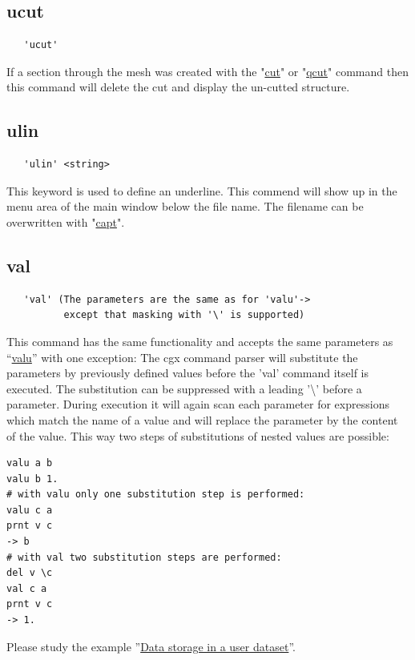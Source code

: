 \documentclass{article}
\providecommand{\htmlref}[2]{\hyperref[#2]{#1}}
\begin{document}
\subsection{\label{ucut}ucut}
\begin{verbatim}
   'ucut'
\end{verbatim}
If a section through the mesh was created with the "\htmlref{cut}{cut}" or "\htmlref{qcut}{qcut}" command then this command will delete the cut and display the un-cutted structure.

\subsection{\label{ulin}ulin}
\begin{verbatim}
   'ulin' <string> 
\end{verbatim}
This keyword is used to define an underline. This commend will show up in the
menu area of the main window below the file name. The filename can be overwritten with "\htmlref{capt}{capt}".

\subsection{\label{val}val}
\begin{verbatim}
   'val' (The parameters are the same as for 'valu'->
          except that masking with '\' is supported)
\end{verbatim}
This command has the same functionality and accepts the same parameters as ``\htmlref{valu}{valu}'' with one exception: The cgx command parser will substitute the parameters by previously defined values before the 'val' command itself is executed. The substitution can be suppressed with a leading '\textbackslash{}' before a parameter. During execution it will again scan each parameter for expressions which match the name of a value and will replace the parameter by the content of the value. This way two steps of substitutions of nested values are possible:
\begin{verbatim}
valu a b
valu b 1.
# with valu only one substitution step is performed:
valu c a
prnt v c
-> b
# with val two substitution steps are performed:
del v \c
val c a
prnt v c
-> 1.
\end{verbatim}
Please study the example ''\htmlref{Data storage in a user dataset}{Data storage in a user dataset}''.
\end{document}
